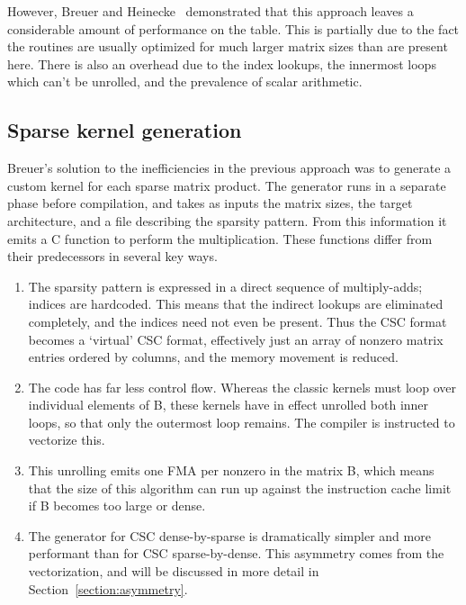       However, Breuer and Heinecke~\cite{breuer} demonstrated that this approach leaves a considerable amount of performance on the table. This is partially due to the fact the routines are usually optimized for much larger matrix sizes than are present here. There is also an overhead due to the index lookups, the innermost loops which can't be unrolled, and the prevalence of scalar arithmetic.

\subsection{Sparse kernel generation}
    
      Breuer's solution to the inefficiencies in the previous approach was to generate a custom kernel for each sparse matrix product. The generator runs in a separate phase before compilation, and takes as inputs the matrix sizes, the target architecture, and a file describing the sparsity pattern. From this information it emits a C function to perform the multiplication. These functions differ from their predecessors in several key ways. 

      \begin{enumerate}
        \item The sparsity pattern is expressed in a direct sequence of multiply-adds; indices are hardcoded. This means that the indirect lookups are eliminated completely, and the indices need not even be present. Thus the CSC format becomes a `virtual' CSC format, effectively just an array of nonzero matrix entries ordered by columns, and the memory movement is reduced.

        \item The code has far less control flow. Whereas the classic kernels must loop over individual elements of B, these kernels have in effect unrolled both inner loops, so that only the outermost loop remains. The compiler is instructed to vectorize this. 

        \item This unrolling emits one FMA per nonzero in the matrix B, which means that the size of this algorithm can run up against the instruction cache limit if B becomes too large or dense.

        \item The generator for CSC dense-by-sparse is dramatically simpler and more performant than for CSC sparse-by-dense. This asymmetry comes from the vectorization, and will be discussed in more detail in Section~\ref{section:asymmetry}.

      \end{enumerate}

